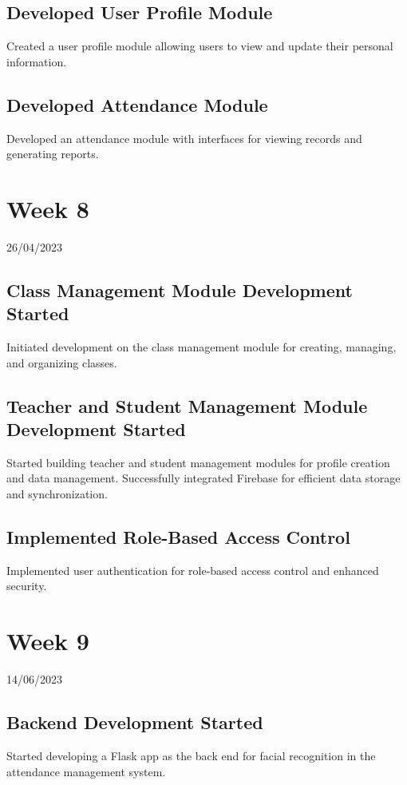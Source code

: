 \documentclass[12pt]{book}
\begin{document}
	\section{Developed User Profile Module}
	Created a user profile module allowing users to view and update their personal information.
	\section{Developed Attendance Module}
	Developed an attendance module with interfaces for viewing records and generating reports.
	
	\chapter{Week 8}
	\justifying
	\large
	26/04/2023
	
	\paragraph{}
	\section{Class Management Module Development Started}
	Initiated development on the class management module for creating, managing, and organizing classes.
	\section{Teacher and Student Management Module Development Started}
	Started building teacher and student management modules for profile creation and data management. Successfully integrated Firebase for efficient data storage and synchronization.
	\section{Implemented Role-Based Access Control}
	Implemented user authentication for role-based access control and enhanced security.
	
	
	\chapter{Week 9}
	\justifying
	\large
	14/06/2023
	
	\paragraph{}
	\section{Backend Development Started}
	Started developing a Flask app as the back end for facial recognition in the attendance management system.
\end{document}
